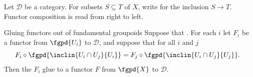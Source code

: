 Let $\mathcal D$ be a category.  For subsets $S\subseteq T$ of $X$, write
 for the inclusion
$S\longrightarrow T$.  Functor composition
 is read from right to left.

\begin{definition}[id=3.2]{Gluing functors out of fundamental groupoids}
Suppose that \hypCoverFamily.  For each $i$ let $F_{i}$ be a functor from
$\fgpd{U_{i}}$ to $\mathcal{D}$, and suppose that for all $i$ and $j$
\[
  F_{i} \circ \fgpd{\inclin{U_{i} \cap U_{j}}{U_{i}}}
    = F_{j} \circ \fgpd{\inclin{U_{i} \cap U_{j}}{U_{j}}}.
\]
Then the $F_{i}$ glue to a functor $F$ from $\fgpd{X}$ to $\mathcal{D}$.
\end{definition}

